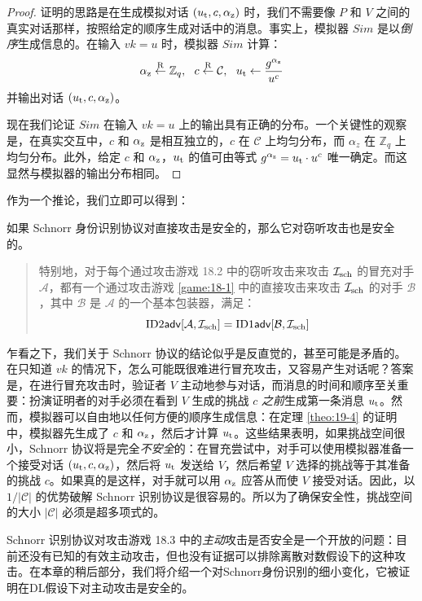 \begin{proof}
	证明的思路是在生成模拟对话 $(u_{\rm t},c,\alpha_{\rm z})$ 时，我们不需要像 $P$ 和 $V$ 之间的真实对话那样，按照给定的顺序生成对话中的消息。事实上，模拟器 ${Sim}$ 是以\emph{倒序}生成信息的。在输入 $vk=u$ 时，模拟器 ${Sim}$ 计算：
		$$\alpha_{\rm z}\overset{\rm R}\leftarrow\mathbb{Z}_q,~~
		c\overset{\rm R}\leftarrow\mathcal{C},~~
		u_{\rm t}\leftarrow\frac{g^{\alpha_{\rm z}}}{u^c}$$
	并输出对话 $(u_{\rm t},c,\alpha_{\rm z})$。
	
	现在我们论证 ${Sim}$ 在输入 $vk=u$ 上的输出具有正确的分布。一个关键性的观察是，在真实交互中，$c$ 和 $\alpha_{\rm z}$ 是相互独立的，$c$ 在 $\mathcal{C}$ 上均匀分布，而 $\alpha_z$ 在 $\mathbb{Z}_q$ 上均匀分布。此外，给定 $c$ 和 $\alpha_{\rm z}$，$u_{\rm t}$ 的值可由等式 $g^{\alpha_{\rm z}}=u_{\rm t}\cdot u^c$ 唯一确定。而这显然与模拟器的输出分布相同。
\end{proof}

作为一个推论，我们立即可以得到：

\begin{theorem}\label{theo:19-5}
	如果 Schnorr 身份识别协议对直接攻击是安全的，那么它对窃听攻击也是安全的。
	
	\begin{quote}
		特别地，对于每个通过攻击游戏 18.2 中的窃听攻击来攻击 $\mathcal{I}_{\rm sch}$ 的冒充对手 $\mathcal{A}$，都有一个通过攻击游戏 \ref{game:18-1} 中的直接攻击来攻击 $\mathcal{I}_{\rm sch}$ 的对手 $\mathcal{B}$，其中 $\mathcal{B}$ 是 $\mathcal{A}$ 的一个基本包装器，满足：
		$${\rm ID2\mathsf{adv}}[\mathcal{A},\mathcal{I}_{\rm sch}]=
		{\rm ID1\mathsf{adv}}[\mathcal{B},\mathcal{I}_{\rm sch}]$$
	\end{quote}
\end{theorem}

乍看之下，我们关于 Schnorr 协议的结论似乎是反直觉的，甚至可能是矛盾的。在只知道 $vk$ 的情况下，怎么可能既很难进行冒充攻击，又容易产生对话呢？答案是，在进行冒充攻击时，验证者 $V$ 主动地参与对话，而消息的时间和顺序至关重要：扮演证明者的对手必须在看到 $V$ 生成的挑战 $c$ \emph{之前}生成第一条消息 $u_{\rm t}$。然而，模拟器可以自由地以任何方便的顺序生成信息：在定理 \ref{theo:19-4} 的证明中，模拟器先生成了 $c$ 和 $\alpha_{\rm z}$，然后才计算 $u_{\rm t}$。这些结果表明，如果挑战空间很小，Schnorr 协议将是完全\emph{不安全}的：在冒充尝试中，对手可以使用模拟器准备一个接受对话 $(u_{\rm t},c,\alpha_{\rm z})$，然后将 $u_{\rm t}$ 发送给 $V$，然后希望 $V$ 选择的挑战等于其准备的挑战 $c$。如果真的是这样，对手就可以用 $\alpha_{\rm z}$ 应答从而使 $V$ 接受对话。因此，以 ${1}/{|\mathcal{C}|}$ 的优势破解 Schnorr 识别协议是很容易的。所以为了确保安全性，挑战空间的大小 $|\mathcal{C}|$ 必须是超多项式的。

Schnorr 识别协议对攻击游戏 18.3 中的\emph{主动}攻击是否安全是一个开放的问题：目前还没有已知的有效主动攻击，但也没有证据可以排除离散对数假设下的这种攻击。在本章的稍后部分，我们将介绍一个对Schnorr身份识别的细小变化，它被证明在DL假设下对主动攻击是安全的。